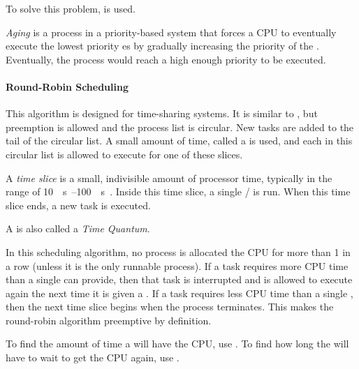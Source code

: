 To solve this problem,   is used.

\begin{definition}[Aging]\label{def:Aging}
  \emph{Aging} is a process in a priority-based system that forces a CPU to eventually execute the lowest priority es by gradually increasing the priority of the .
  Eventually, the process would reach a high enough priority to be executed.
\end{definition}

\paragraph{Round-Robin Scheduling}\label{par:Round_Robin_Scheduling}
This algorithm is designed for time-sharing systems.
It is similar to , but preemption is allowed and the process list is circular.
New tasks are added to the tail of the circular list.
A small amount of time, called a  is used, and each  in this circular list is allowed to execute for one of these slices.

\begin{definition}\label{def:Time_Slice}
  A \emph{time slice} is a small, indivisible amount of processor time, typically in the range of \SIrange{10}{100}{\milli{} \second{}}.
  Inside this time slice, a single / is run.
  When this time slice ends, a new task is executed.

  \begin{remark}\label{rmk:Time_Quantum}
    A  is also called a \emph{Time Quantum}.
  \end{remark}
\end{definition}

In this scheduling algorithm, no process is allocated the CPU for more than 1  in a row (unless it is the only runnable process).
If a task requires more CPU time than a single  can provide, then that task is interrupted and is allowed to execute again the next time it is given a .
If a task requires less CPU time than a single , then the next time slice begins when the process terminates.
This makes the round-robin algorithm preemptive by definition.

To find the amount of time a  will have the CPU, use .
To find how long the  will have to wait to get the CPU again, use .

